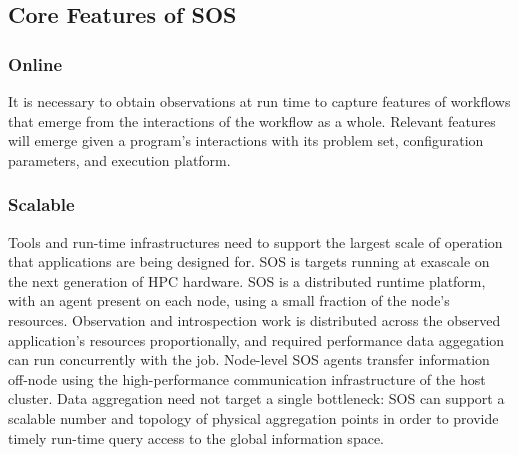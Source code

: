 \subsection{Core Features of SOS}
%
%
%
%
%
%
%
%
%
%
%
%
\subsubsection{Online}
%
It is necessary to obtain observations at run time to capture features
of workflows that emerge from the interactions of the workflow as a
whole.
%
Relevant features will emerge given a program's interactions
with its problem set, configuration parameters, and execution platform.
%
\subsubsection{Scalable}
%
Tools and run-time infrastructures need to support the largest scale of
operation that applications are being designed for.
%
SOS is targets running at exascale on the next generation of HPC
hardware.
%
SOS is a distributed runtime platform, with an agent present on each
node, using a small fraction of the node's resources.
%
Observation and introspection work is distributed across
the observed application's resources proportionally, and required
performance data aggegation can run concurrently with the job.
%
Node-level SOS agents transfer information off-node using the
high-performance communication infrastructure of the host cluster.
%
Data aggregation need not target a single bottleneck: SOS can support
a scalable number and topology of physical aggregation points in order
to provide timely run-time query access to the global information
space.
%
